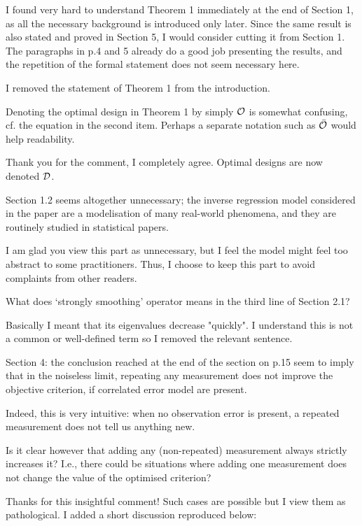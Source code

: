   
\RC I found very hard to understand Theorem 1 immediately at the end
of Section 1, as all the necessary background is introduced only
later. Since the same result is also stated and proved in Section 5, I
would consider cutting it from Section 1. The paragraphs in p.4 and 5
already do a good job presenting the results, and the repetition of
the formal statement does not seem necessary here.

\AR I removed the statement of Theorem 1 from the introduction.


\RC Denoting the optimal design in Theorem 1 by simply $\mathcal{O}$ is
somewhat confusing, cf. the equation in the second item. Perhaps a
separate notation such as $\bar{\mathcal{O}}$ would help readability.

\AR Thank you for the comment, I completely agree. Optimal designs are
now denoted $\mathcal{D}$.

  
\RC Section 1.2 seems altogether unnecessary; the inverse regression
model considered in the paper are a modelisation of many real-world
phenomena, and they are routinely studied in statistical papers.

\AR I am glad you view this part as unnecessary, but I feel the model
might feel too abstract to some practitioners. Thus, I choose to keep
this part to avoid complaints from other readers.



\RC What does ‘strongly smoothing’ operator means in the third line of Section 2.1?

\AR Basically I meant that its eigenvalues decrease "quickly". I
understand this is not a common or well-defined term so I removed the
relevant sentence.

  
\RC Section 4: the conclusion reached at the end of the section on
p.15 seem to imply that in the noiseless limit, repeating any
measurement does not improve the objective criterion, if correlated
error model are present.

\AR Indeed, this is very intuitive: when no observation error is
present, a repeated measurement does not tell us anything new.


\RC Is it clear however that adding any (non-repeated) measurement
always strictly increases it? I.e., there could be situations where
adding one measurement does not change the value of the optimised
criterion?

\AR Thanks for this insightful comment! Such cases are possible but I
view them as pathological. I added a short discussion reproduced
below:



